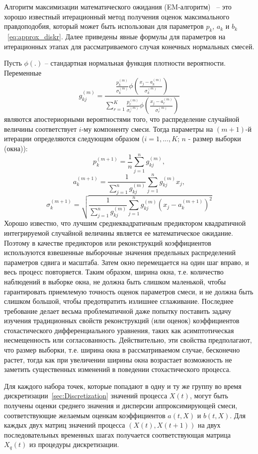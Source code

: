 Алгоритм максимизации математического ожидания (EM-алгоритм)~\cite{McLachlan2007} -- это хорошо известный итерационный метод получения оценок максимального правдоподобия, который может быть использован для параметров $p_k$, $a_k$ и $b_k$~\eqref{eq:approx_diskr}. Далее приведены явные формулы для параметров на итерационных этапах для рассматриваемого случая конечных нормальных смесей. 

Пусть $\phi(.)$ -- стандартная нормальная функция плотности вероятности. Переменные 
$$
g_{kj}^{(m)}= \frac{\frac{p_k^{(m)}}{\sigma_k^{(m)}} \phi\left(\frac{x_j - a_k^{(m)}}{\sigma_k^{(m)}} \right)}{\sum\limits_{r=1}^K \frac{p_r^{(m)}}{\sigma_r^{(m)}} \phi\left(\frac{x_j - a_r^{(m)}}{\sigma_r^{(m)}} \right)}
$$
являются апостериорными вероятностями того, что распределение случайной величины соответствует $i$-му компоненту смеси. Тогда параметры на $(m+1)$-й итерации определяются следующим образом ($i=1,...,K$; $n$ - размер выборки (окна)):
$$
p_k^{(m+1)} = \frac{1}{n} \sum\limits_{j=1}^n g_{kj}^{(m)},
$$
$$
a_k^{(m+1)} = \frac{1}{\sum\limits_{j=1}^n g_{kj}^{(m)}} \sum\limits_{j=1}^n g_{kj}^{(m)} x_j,
$$
$$
\sigma_k^{(m+1)} = \sqrt{\frac{1}{\sum\limits_{j=1}^n g_{kj}^{(m)}} \sum\limits_{j=1}^n g_{kj}^{(m)} (x_j - a_k^{(m+1)})^2}
$$
Хорошо известно, что лучшим среднеквадратичным предиктором квадратичной интегрируемой случайной величины является ее математическое ожидание. Поэтому в качестве предикторов или реконструкций коэффициентов используются взвешенные выборочные значения предельных распределений параметров сдвига и масштаба. Затем окно перемещается на один шаг вправо, и весь процесс повторяется. Таким образом, ширина окна, т.е. количество наблюдений в выборке окна, не должна быть слишком маленькой, чтобы гарантировать приемлемую точность оценок параметров смеси, и не должна быть слишком большой, чтобы предотвратить излишнее сглаживание. Последнее требование делает весьма проблематичной даже попытку поставить задачу изучения традиционных свойств реконструкций (или оценок) коэффициентов стохастического дифференциального уравнения, таких как асимптотическая несмещенность или согласованность. Действительно, эти свойства предполагают, что размер выборки, т.е. ширина окна в рассматриваемом случае, бесконечно растет, тогда как при увеличении ширины окна возрастает возможность не заметить существенных изменений в поведении стохастического процесса.

Для каждого набора точек, которые попадают в одну и ту же группу во время дискретизации~\ref{sec:Discretization} значений процесса $X(t)$, могут быть получены оценки среднего значения и дисперсии аппроксимирующей смеси, соответствующие желаемым оценкам коэффициентов $a(t,X)$ и $b(t,X)$. Для каждых двух матриц значений процесса $(X(t),X(t+1))$ на двух последовательных временных шагах получается соответствующая матрица $X_q(t)$ из процедуры дискретизации.


